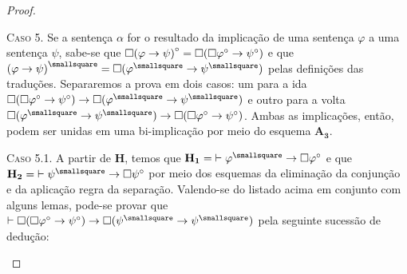 \begin{theorem}
\begin{proof}
        \begin{case}
            \textsc{Caso 5.}
            Se a sentença $\alpha$ for o resultado da implicação de uma sentença $\varphi$ a uma sentença $\psi$, sabe-se que $\mathord{\square}{(\varphi\to\psi)}^\circ=\mathord{\square}(\mathord{\square}\varphi^\circ\to\psi^\circ)$ e que ${(\varphi\to\psi)}^\smallsquare=\nec(\varphi^\smallsquare\to\psi^\smallsquare)$ pelas definições das traduções.
            Separaremos a prova em dois casos: um para a ida $\nec(\nec\varphi^\circ\to\psi^\circ)\to\nec(\varphi^\smallsquare\to\psi^\smallsquare)$ e outro para a volta $\nec(\varphi^\smallsquare\to\psi^\smallsquare)\to\nec(\nec\varphi^\circ\to\psi^\circ)$.
            Ambas as implicações, então, podem ser unidas em uma bi-implicação por meio do esquema \hyperref[MA3]{$\mathbf{A_3}$}.
        \end{case}

            \begin{subcase}
                \textsc{Caso 5.1.}
                A partir de $\mathbf{H}$, temos que $\mathbf{H_1}={\entails\varphi^\smallsquare\to\nec\varphi^\circ}$ e que $\mathbf{H_2}={\entails\psi^\smallsquare\to\nec\psi^\circ}$ por meio dos esquemas da eliminação da conjunção e da aplicação regra da separação.
                Valendo-se do listado acima em conjunto com alguns lemas, pode-se provar que $\entails\nec(\nec\varphi^\circ\to\psi^\circ)\to\nec(\psi^\smallsquare\to\psi^\smallsquare)$ pela seguinte sucessão de dedução:


\end{subcase}
\end{proof}
\end{theorem}

